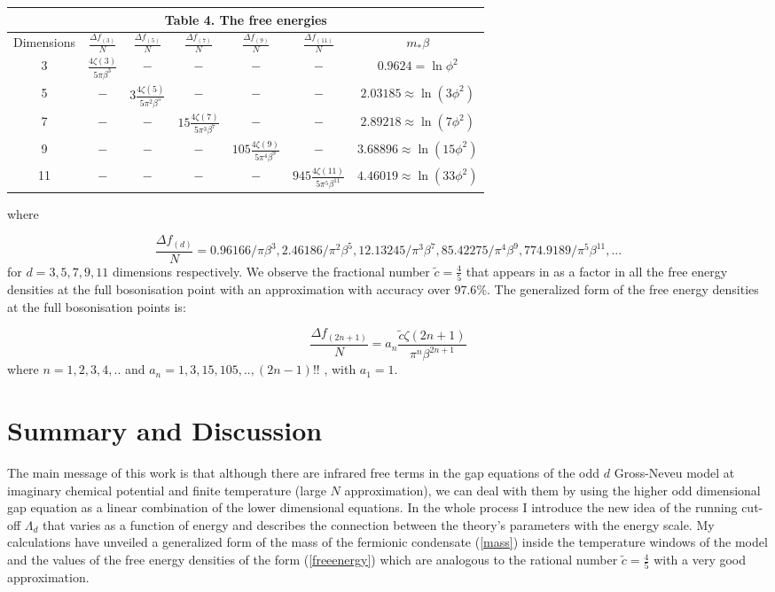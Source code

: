 \documentclass[twoside]{article}
\begin{document}
{\centering
	\begin{tabular}{|c|c|c|c|c|c|c|}
		\hline 
		\multicolumn{7}{|c|}{\textbf{Table 4. The free energies}} \\ 
		\hline 
		Dimensions & $\frac{\Delta f_{(3)}}{N}$ & $\frac{\Delta f_{(5)}}{N}$ & $\frac{\Delta f_{(7)}}{N}$ & $\frac{\Delta f_{(9)}}{N}$ & $\frac{\Delta f_{(11)}}{N}$ & $m_*\beta$ \\ 
		\hline 
		3 & $\frac{4 \zeta(3)}{5\pi\beta^3}$ & $-$ & $-$ & $-$ & $-$ & $0.9624=\ln\phi^2$ \\ 
		\hline 
		5 & $-$ & $3\frac{4\zeta(5)}{5\pi^2\beta^5}$ & $-$ & $-$ & $-$ & $2.03185\approx\ln(3\phi^2)$ \\ 
		\hline 
		7 & $-$ & $-$ & $15\frac{4\zeta(7)}{5\pi^3\beta^7}$ & $-$ & $-$ & $2.89218\approx\ln(7\phi^2)$ \\ 
		\hline
		9 & $-$ & $-$ & $-$ & $105\frac{4\zeta(9)}{5\pi^4\beta^9}$ & $-$ & $3.68896\approx\ln(15\phi^2)$ \\ 
		\hline 
		11 & $-$ & $-$ & $-$ & $-$ & $945\frac{4\zeta(11)}{5\pi^5\beta^{11}}$ & $4.46019\approx\ln(33\phi^2)$\\
		\hline 
	\end{tabular}\par}
where 

\begin{equation}
\frac{\Delta f_{(d)}}{N}=0.96166/\pi\beta^3, 2.46186/\pi^2\beta^5, 12.13245/\pi^3\beta^7, 85.42275/\pi^4\beta^9, 774.9189/\pi^5\beta^{11}, ...
\end{equation}
for $d=3,5,7,9,11$ dimensions respectively. We observe the fractional number $\tilde{c}=\frac{4}{5}$ that appears in \cite{Sachdev:1993pr} as a factor in all the free energy densities at the full bosonisation point with an approximation with accuracy over $97.6\%$. The generalized form of the free energy densities at the full bosonisation points is:

\begin{equation}
\label{freeenergy}
\frac{\Delta f_{(2n+1)}}{N}=a_n\frac{\tilde{c}\zeta(2n+1)}{\pi^n\beta^{2n+1}}
\end{equation}
where $n=1,2,3,4,..$ and $a_n=1,3,15,105,..,(2n-1)!!$ , with $a_1=1$.
\section{Summary and Discussion}

The main message of this work is that although there are infrared free terms in the gap equations of the odd $d$ Gross-Neveu model at imaginary chemical potential and finite temperature (large $N$ approximation), we can deal with them by using the higher odd dimensional gap equation as a linear combination of the lower dimensional equations. In the whole process I introduce the new idea of the running cut-off $\Lambda_d$ that varies as a function of energy and describes the connection between the theory's parameters with the energy scale. My calculations have unveiled a generalized form of the mass of the fermionic condensate (\ref{mass}) inside the temperature windows of the model and the values of the free energy densities of the form (\ref{freeenergy}) which are analogous to the rational number $\tilde{c}=\frac{4}{5}$ with a very good approximation.
\end{document}
